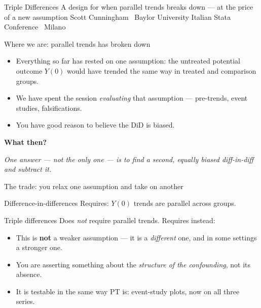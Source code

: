 \documentclass[aspectratio=169,11pt]{beamer}
\begin{document}
\codechellatitle
  {Triple Differences}
  {A design for when parallel trends breaks down --- at the price of a new assumption}
  {Scott Cunningham \textperiodcentered\ Baylor University}
  {Italian Stata Conference \textperiodcentered\ Milano}


\begin{frame}{Where we are: parallel trends has broken down}
\vspace{0.4em}
\begin{itemize}\setlength\itemsep{0.5em}
  \item Everything so far has rested on one assumption: the untreated potential outcome $Y(0)$ would have trended the same way in treated and comparison groups.
  \item We have spent the session \textit{evaluating} that assumption --- pre-trends, event studies, falsifications.
  \item {} \;You have good reason to believe the DiD is biased.
\end{itemize}
\vspace{0.6em}
\begin{center}
\textbf{What then?}
\end{center}
\vspace{0.3em}
\begin{center}\small\color{warmgray}\itshape
One answer --- not the only one --- is to find a second, equally biased diff-in-diff and subtract it.
\end{center}
\end{frame}

\begin{frame}{The trade: you relax one assumption and take on another}
\begin{block}{Difference-in-differences}
\centering
Requires: \;$Y(0)$ trends are parallel across groups.
\end{block}
\vspace{0.2em}
\begin{block}{Triple differences}
\centering
Does \textit{not} require parallel trends. \;Requires instead: \;
\end{block}
\vspace{0.4em}
\begin{itemize}\small\setlength\itemsep{0.2em}
  \item This is \textbf{not} a weaker assumption --- it is a \textit{different} one, and in some settings a stronger one.
  \item You are asserting something about the \textit{structure of the confounding}, not its absence.
  \item It is testable in the same way PT is: event-study plots, now on all three series.
\end{itemize}
\vspace{-0.7em}
\end{frame}
\end{document}
